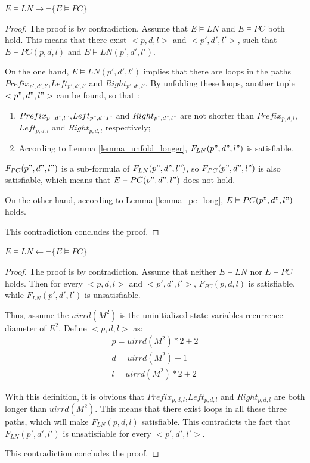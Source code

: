 \documentclass[journal]{IEEEtran}
\begin{document}
\begin{theorem}[]\label{thm_pc_nln}
$E\vDash LN\to \neg \{E\vDash PC\}$
\end{theorem}
\begin{proof}
The proof is by contradiction.
Assume that $E\vDash LN$ and $E\vDash PC$ both hold.
This means that there exist $<p,d,l>$ and $<p',d',l'>$,
such that $E\vDash PC(p,d,l)$ and $E\vDash LN(p',d',l')$.

On the one hand,
$E\vDash LN(p',d',l')$ implies that there are loops in the paths $Prefix_{p',d',l'}$,$Left_{p',d',l'}$ and $Right_{p',d',l'}$.
By unfolding these loops,
another tuple $<p",d",l">$ can be found,
so that :
\begin{enumerate}
\item $Prefix_{p",d",l"}$,$Left_{p",d",l"}$ and $Right_{p",d",l"}$ are not shorter than $Prefix_{p,d,l}$,$Left_{p,d,l}$ and $Right_{p,d,l}$ respectively;
\item According to Lemma \ref{lemma_unfold_longer},
$F_{LN}(p",d",l")$ is satisfiable.
\end{enumerate}

$F_{PC}(p",d",l")$ is a sub-formula of $F_{LN}(p",d",l")$,
so $F_{PC}(p",d",l")$ is also satisfiable,
which means that $E\vDash PC(p",d",l")$ does not hold.

On the other hand,
according to Lemma \ref{lemma_pc_long},
$E\vDash PC(p",d",l")$ holds.

This contradiction concludes the proof.
\end{proof}

\begin{theorem}[]\label{thm_nln_pc}
$E\vDash LN\gets \neg \{E\vDash PC\}$
\end{theorem}
\begin{proof}
The proof is by contradiction.
Assume that neither $E\vDash LN$ nor $E\vDash PC$ holds.
Then for every $<p,d,l>$ and $<p',d',l'>$,
$F_{PC}(p,d,l)$ is satisfiable,
while $F_{LN}(p',d',l')$ is unsatisfiable.

Thus,
assume the $uirrd(M^2)$ is the uninitialized state variables recurrence diameter of $E^2$.
Define $<p,d,l>$ as:
\begin{equation}
\begin{array}{c}
p=uirrd(M^2)*2+2 \\
d=uirrd(M^2)+1 \\
l=uirrd(M^2)*2+2
\end{array}
\end{equation}

With this definition,
it is obvious that $Prefix_{p,d,l}$,$Left_{p,d,l}$ and $Right_{p,d,l}$ are both longer than $uirrd(M^2)$.
This means that there exist loops in all these three paths,
which will make $F_{LN}(p,d,l)$ satisfiable.
This contradicts the fact that $F_{LN}(p',d',l')$ is unsatisfiable for every $<p',d',l'>$.

This contradiction concludes the proof.
\end{proof}
\end{document}
